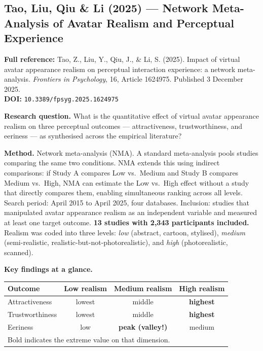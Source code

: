 \documentclass[11pt, a4paper]{article}
\begin{document}
\vspace{8pt}
\subsection{Tao, Liu, Qiu \& Li (2025) --- Network Meta-Analysis of Avatar Realism and Perceptual Experience}

\begin{refbox}
\textbf{Full reference:} Tao, Z., Liu, Y., Qiu, J., \& Li, S. (2025). Impact of virtual avatar appearance realism on perceptual interaction experience: a network meta-analysis. \textit{Frontiers in Psychology}, 16, Article 1624975. Published 3 December 2025.\\[4pt]
\textbf{DOI:} \texttt{10.3389/fpsyg.2025.1624975}
\end{refbox}

\textbf{Research question.} What is the quantitative effect of virtual avatar appearance realism on three perceptual outcomes --- attractiveness, trustworthiness, and eeriness --- as synthesised across the empirical literature?

\textbf{Method.} Network meta-analysis (NMA). A standard meta-analysis pools studies comparing the same two conditions. NMA extends this using indirect comparisons: if Study A compares Low vs.\ Medium and Study B compares Medium vs.\ High, NMA can estimate the Low vs.\ High effect without a study that directly compares them, enabling simultaneous ranking across all levels. Search period: April 2015 to April 2025, four databases. Inclusion: studies that manipulated avatar appearance realism as an independent variable and measured at least one target outcome. \textbf{13 studies with 2,343 participants included.} Realism was coded into three levels: \textit{low} (abstract, cartoon, stylised), \textit{medium} (semi-realistic, realistic-but-not-photorealistic), and \textit{high} (photorealistic, scanned).

\medskip
\noindent\textbf{Key findings at a glance.}

\begin{center}
\begin{tabular}{lccc}
\toprule
\textbf{Outcome} & \textbf{Low realism} & \textbf{Medium realism} & \textbf{High realism} \\
\midrule
Attractiveness & lowest & middle & \textbf{highest} \\
Trustworthiness & lowest & middle & \textbf{highest} \\
Eeriness & low & \textbf{peak (valley!)} & medium \\
\bottomrule
\multicolumn{4}{l}{\small Bold indicates the extreme value on that dimension.}
\end{tabular}
\end{center}
\end{document}
